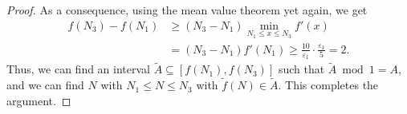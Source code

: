 \documentclass[10pt,a4paper]{amsart}
\newcommand{\e}{\varepsilon}
\renewcommand{\subset}{\subseteq}
\begin{document}
\begin{proof}
As a consequence, using the mean value theorem yet again, we get
\begin{align*}
	f(N_3) - f(N_1) &\geq (N_3-N_1) \min_{N_1 \leq x \leq N_3} f'(x) 
	\\ & = (N_3-N_1) f'(N_1) 
	\geq \frac{10}{\e_1} \cdot \frac{\e_1}{5} = 2.
\end{align*}
	Thus, we can find an interval $\tilde A \subset [f(N_1),f(N_3)]$ such that $\tilde A \bmod 1 = A$, and we can find $N$ with $N_1 \leq N \leq N_3$ with $\tilde f(N) \in \tilde A$. This completes the argument.
\end{proof}
\end{document}
